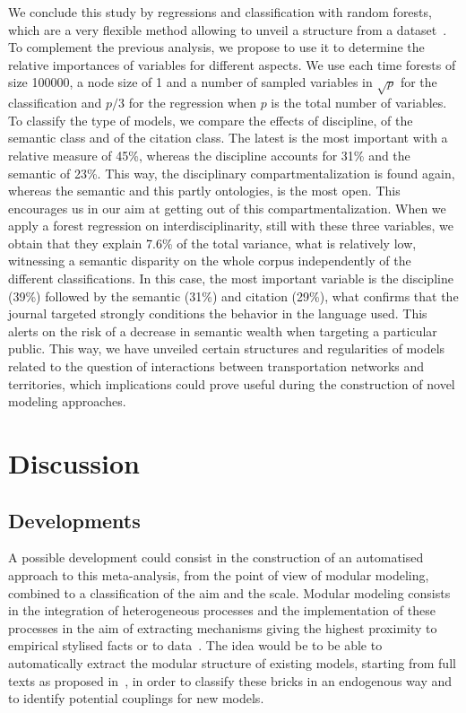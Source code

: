 \documentclass[10pt]{article}
\begin{document}
We conclude this study by regressions and classification with random forests, which are a very flexible method allowing to unveil a structure from a dataset~\cite{liaw2002classification}. To complement the previous analysis, we propose to use it to determine the relative importances of variables for different aspects. We use each time forests of size 100000, a node size of 1 and a number of sampled variables in $\sqrt{p}$ for the classification and $p/3$ for the regression when $p$ is the total number of variables. To classify the type of models, we compare the effects of discipline, of the semantic class and of the citation class. The latest is the most important with a relative measure of 45\%, whereas the discipline accounts for 31\% and the semantic of 23\%. This way, the disciplinary compartmentalization is found again, whereas the semantic and this partly ontologies, is the most open. This encourages us in our aim at getting out of this compartmentalization. When we apply a forest regression on interdisciplinarity, still with these three variables, we obtain that they explain 7.6\% of the total variance, what is relatively low, witnessing a semantic disparity on the whole corpus independently of the different classifications. In this case, the most important variable is the discipline (39\%) followed by the semantic (31\%) and citation (29\%), what confirms that the journal targeted strongly conditions the behavior in the language used. This alerts on the risk of a decrease in semantic wealth when targeting a particular public. This way, we have unveiled certain structures and regularities of models related to the question of interactions between transportation networks and territories, which implications could prove useful during the construction of novel modeling approaches.


\section{Discussion}

\subsection{Developments}

A possible development could consist in the construction of an automatised approach to this meta-analysis, from the point of view of modular modeling, combined to a classification of the aim and the scale. Modular modeling consists in the integration of heterogeneous processes and the implementation of these processes in the aim of extracting mechanisms giving the highest proximity to empirical stylised facts or to data~\cite{cottineau2015growing}. The idea would be to be able to automatically extract the modular structure of existing models, starting from full texts as proposed in~\cite{raimbault2019empowering}, in order to classify these bricks in an endogenous way and to identify potential couplings for new models.
\end{document}
